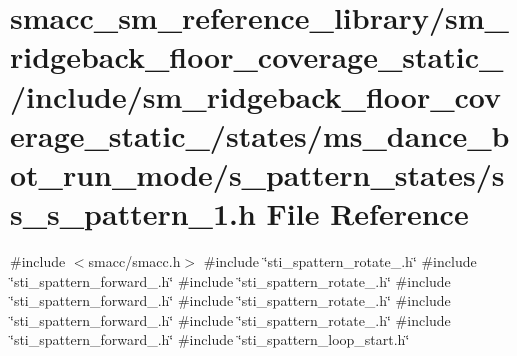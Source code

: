 \hypertarget{sm__ridgeback__floor__coverage__static__1_2include_2sm__ridgeback__floor__coverage__static__1_2se05b2f10a67baebfa8c599213e3fb38e}{}\section{smacc\+\_\+sm\+\_\+reference\+\_\+library/sm\+\_\+ridgeback\+\_\+floor\+\_\+coverage\+\_\+static\+\_/include/sm\+\_\+ridgeback\+\_\+floor\+\_\+coverage\+\_\+static\+\_/states/ms\+\_\+dance\+\_\+bot\+\_\+run\+\_\+mode/s\+\_\+pattern\+\_\+states/ss\+\_\+s\+\_\+pattern\+\_\+1.h File Reference}
\label{sm__ridgeback__floor__coverage__static__1_2include_2sm__ridgeback__floor__coverage__static__1_2se05b2f10a67baebfa8c599213e3fb38e}
{\ttfamily \#include $<$smacc/smacc.\+h$>$}\newline
{\ttfamily \#include \char`\"{}sti\+\_\+spattern\+\_\+rotate\+\_.\+h\char`\"{}}\newline
{\ttfamily \#include \char`\"{}sti\+\_\+spattern\+\_\+forward\+\_.\+h\char`\"{}}\newline
{\ttfamily \#include \char`\"{}sti\+\_\+spattern\+\_\+rotate\+\_.\+h\char`\"{}}\newline
{\ttfamily \#include \char`\"{}sti\+\_\+spattern\+\_\+forward\+\_.\+h\char`\"{}}\newline
{\ttfamily \#include \char`\"{}sti\+\_\+spattern\+\_\+rotate\+\_.\+h\char`\"{}}\newline
{\ttfamily \#include \char`\"{}sti\+\_\+spattern\+\_\+forward\+\_.\+h\char`\"{}}\newline
{\ttfamily \#include \char`\"{}sti\+\_\+spattern\+\_\+rotate\+\_.\+h\char`\"{}}\newline
{\ttfamily \#include \char`\"{}sti\+\_\+spattern\+\_\+forward\+\_.\+h\char`\"{}}\newline
{\ttfamily \#include \char`\"{}sti\+\_\+spattern\+\_\+loop\+\_\+start.\+h\char`\"{}}\newline
